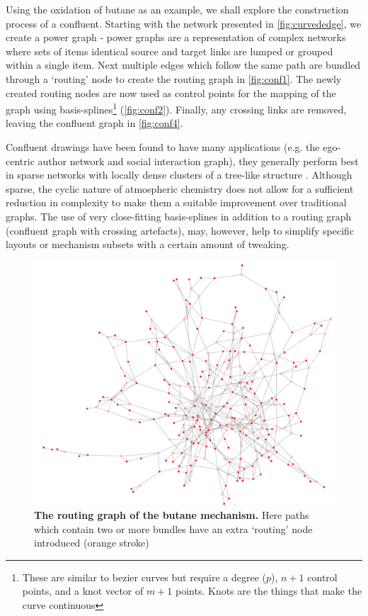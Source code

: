 Using the oxidation of butane as an example, we shall explore the construction process of a confluent. Starting with the network presented in \autoref{fig:curvededge}, we create a power graph - 
power graphs are a representation of complex networks where sets of items identical source and target links are lumped or grouped within a single item. Next multiple edges which follow the same path are bundled through a `routing' node to create the routing graph in \autoref{fig:conf1}. The newly created routing nodes are now used as control points for the mapping of the graph using basis-splines\footnote{These are similar to bezier curves but require a degree ($p$), $n+1$ control points, and a knot vector of $m+1$ points. Knots are the things that make the curve continuous } (\autoref{fig:conf2}). Finally, any crossing links are removed, leaving the confluent graph in \autoref{fig:conf4}. 

Confluent drawings have been found to have many applications (e.g. the ego-centric author network and social interaction graph), they generally perform best in sparse networks with locally dense clusters of a tree-like structure \citep{confluent17}. Although sparse, the cyclic nature of atmospheric chemistry does not allow for a sufficient reduction in complexity to make them a suitable improvement over traditional graphs. The use of very close-fitting basis-splines in addition to a routing graph (confluent graph with crossing artefacts), may, however, help to simplify specific layouts or mechanism subsets with a certain amount of tweaking. 

\begin{figure}[H]
     \centering
     \includegraphics[width=.8\textwidth]{figures_c1/layout/confluent/1.png}
        \caption{\textbf{The routing graph of the butane mechanism.} Here paths which contain two or more bundles have an extra `routing' node introduced (orange stroke) }
      \label{fig:conf1}
\end{figure}

